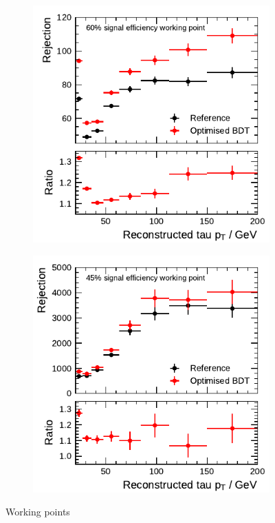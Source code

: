\begin{figure}[ht]
  \centering
  \begin{subfigure}[t]{0.48\textwidth}
    \centering
    \includegraphics{./figures/bdt_perf/post_optimisation/rejection_tight_1p.pdf}
  \end{subfigure}\hfill
  \begin{subfigure}[t]{0.48\textwidth}
    \centering
    \includegraphics{./figures/bdt_perf/post_optimisation/rejection_tight_3p.pdf}
  \end{subfigure}
  \caption{Working points}
\end{figure}



